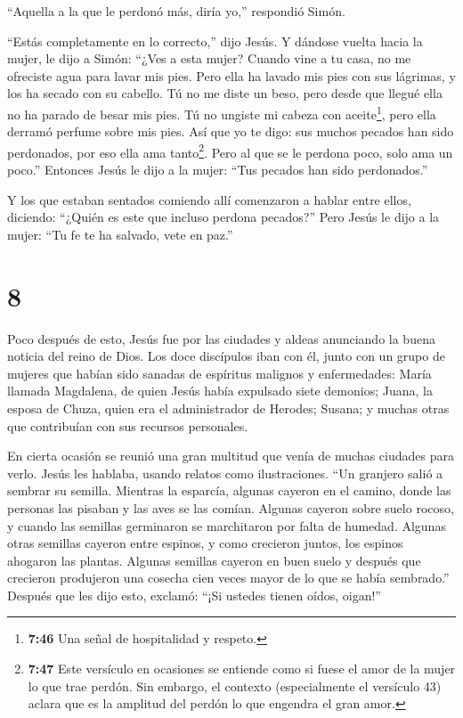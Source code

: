  ``Aquella a la que le perdonó más, diría yo,'' respondió
Simón.

``Estás completamente en lo correcto,'' dijo Jesús.  Y
dándose vuelta hacia la mujer, le dijo a Simón: ``¿Ves a esta mujer?
Cuando vine a tu casa, no me ofreciste agua para lavar mis pies. Pero
ella ha lavado mis pies con sus lágrimas, y los ha secado con su
cabello.  Tú no me diste un beso, pero desde que llegué
ella no ha parado de besar mis pies.  Tú no ungiste mi
cabeza con aceite\footnote{\textbf{7:46} Una señal de hospitalidad y
  respeto.}, pero ella derramó perfume sobre mis pies.  Así
que yo te digo: sus muchos pecados han sido perdonados, por eso ella ama
tanto\footnote{\textbf{7:47} Este versículo en ocasiones se entiende
  como si fuese el amor de la mujer lo que trae perdón. Sin embargo, el
  contexto (especialmente el versículo 43) aclara que es la amplitud del
  perdón lo que engendra el gran amor.}. Pero al que se le perdona poco,
solo ama un poco.''  Entonces Jesús le dijo a la mujer:
``Tus pecados han sido perdonados.''

 Y los que estaban sentados comiendo allí comenzaron a
hablar entre ellos, diciendo: ``¿Quién es este que incluso perdona
pecados?''  Pero Jesús le dijo a la mujer: ``Tu fe te ha
salvado, vete en paz.''

\hypertarget{section-7}{%
\section{8}\label{section-7}}

 Poco después de esto, Jesús fue por las ciudades y aldeas
anunciando la buena noticia del reino de Dios. Los doce discípulos iban
con él,  junto con un grupo de mujeres que habían sido
sanadas de espíritus malignos y enfermedades: María llamada Magdalena,
de quien Jesús había expulsado siete demonios;  Juana, la
esposa de Chuza, quien era el administrador de Herodes; Susana; y muchas
otras que contribuían con sus recursos personales.

 En cierta ocasión se reunió una gran multitud que venía de
muchas ciudades para verlo. Jesús les hablaba, usando relatos como
ilustraciones.  ``Un granjero salió a sembrar su semilla.
Mientras la esparcía, algunas cayeron en el camino, donde las personas
las pisaban y las aves se las comían.  Algunas cayeron sobre
suelo rocoso, y cuando las semillas germinaron se marchitaron por falta
de humedad.  Algunas otras semillas cayeron entre espinos, y
como crecieron juntos, los espinos ahogaron las plantas. 
Algunas semillas cayeron en buen suelo y después que crecieron
produjeron una cosecha cien veces mayor de lo que se había sembrado.''
Después que les dijo esto, exclamó: ``¡Si ustedes tienen oídos, oigan!''

